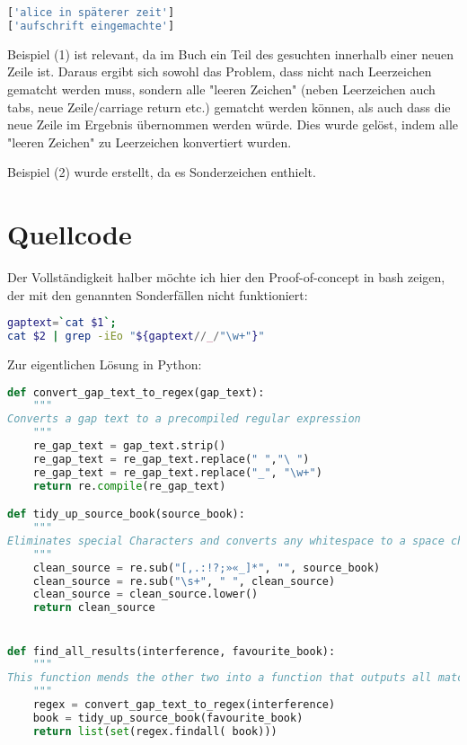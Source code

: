 \documentclass[a4paper,10pt,ngerman]{scrartcl}
\begin{document}
\begin{lstlisting}[language=Python]
['alice in späterer zeit']
['aufschrift eingemachte']
\end{lstlisting}

Beispiel (1) ist relevant, da im Buch ein Teil des gesuchten innerhalb einer neuen Zeile ist. Daraus ergibt sich sowohl das Problem, dass nicht nach Leerzeichen gematcht werden muss, sondern alle "leeren Zeichen" (neben Leerzeichen auch tabs, neue Zeile/carriage return etc.) gematcht werden können, als auch dass die neue Zeile im Ergebnis übernommen werden würde. Dies wurde gelöst, indem alle "leeren Zeichen" zu Leerzeichen konvertiert wurden.

Beispiel (2) wurde erstellt, da es Sonderzeichen enthielt.


\section{Quellcode}
Der Vollständigkeit halber möchte ich hier den Proof-of-concept in bash zeigen, der mit den genannten Sonderfällen nicht funktioniert:
\begin{lstlisting}[language=bash]
gaptext=`cat $1`;
cat $2 | grep -iEo "${gaptext//_/"\w+"}"
\end{lstlisting}

Zur eigentlichen Lösung in Python:
\begin{lstlisting}[language=Python]
def convert_gap_text_to_regex(gap_text):
    """
Converts a gap text to a precompiled regular expression
    """
    re_gap_text = gap_text.strip()
    re_gap_text = re_gap_text.replace(" ","\ ")
    re_gap_text = re_gap_text.replace("_", "\w+")
    return re.compile(re_gap_text)

def tidy_up_source_book(source_book):
    """
Eliminates special Characters and converts any whitespace to a space char
    """
    clean_source = re.sub("[,.:!?;»«_]*", "", source_book)
    clean_source = re.sub("\s+", " ", clean_source)
    clean_source = clean_source.lower()
    return clean_source


def find_all_results(interference, favourite_book):
    """
This function mends the other two into a function that outputs all matches.
    """
    regex = convert_gap_text_to_regex(interference)
    book = tidy_up_source_book(favourite_book)
    return list(set(regex.findall( book)))
\end{lstlisting}
\end{document}
